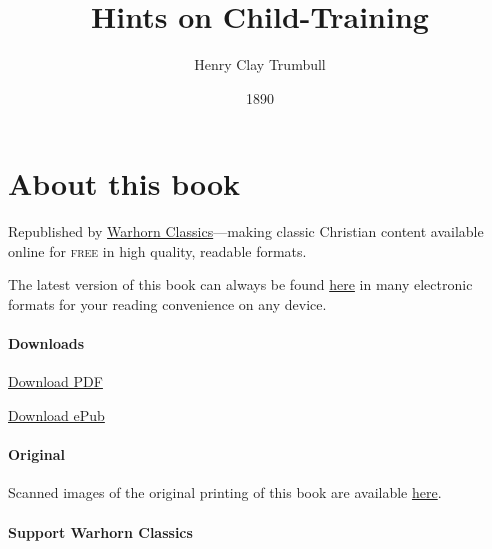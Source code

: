 \documentclass[
]{book}
\title{Hints on Child-Training}
\author{Henry Clay Trumbull}
\date{1890}
\begin{document}
\maketitle

\mainmatter
{}

{
\setcounter{tocdepth}{1}
\tableofcontents
}
\hypertarget{about-this-book}{%
\chapter*{About this book}\label{about-this-book}}

Republished by \href{https://classics.warhornmedia.com/}{Warhorn Classics}---making classic Christian content available online for \textsc{free} in high quality, readable formats.

The latest version of this book can always be found \href{https://warhornmedia.github.io/child-training-trumbull/}{here} in many electronic formats for your reading convenience on any device.

\hypertarget{downloads}{%
\subsubsection*{Downloads}\label{downloads}}

\href{https://warhornmedia.github.io/child-training-trumbull//Trumbull-Hints_on_Child_Training.pdf}{Download PDF}

\href{https://warhornmedia.github.io/child-training-trumbull//Trumbull-Hints_on_Child_Training.epub}{Download ePub}

\hypertarget{original}{%
\subsubsection*{Original}\label{original}}

Scanned images of the original printing of this book are available \href{https://archive.org/details/hintsonchildtrai00trum}{here}.

\hypertarget{support-warhorn-classics}{%
\subsubsection*{Support Warhorn Classics}\label{support-warhorn-classics}}
\end{document}
